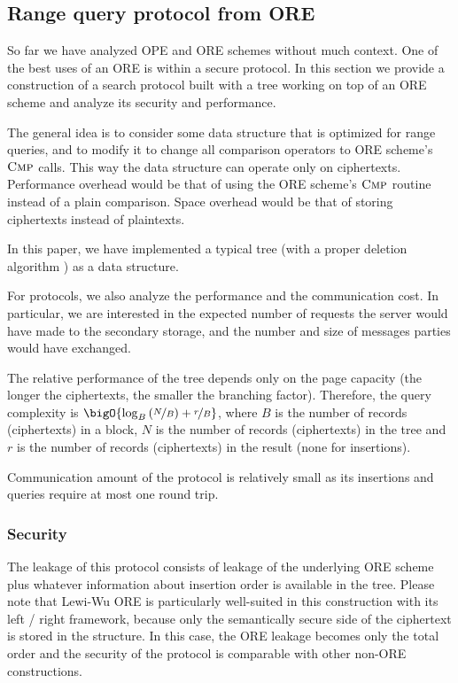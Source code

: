 \subsection{Range query protocol from ORE}\label{section:range-snapshot:ore-to-protocol}

	So far we have analyzed OPE and ORE schemes without much context.
	One of the best uses of an ORE is within a secure protocol.
	In this section we provide a construction of a search protocol built with a {\BPlus} tree working on top of an ORE scheme and analyze its security and performance.

	The general idea is to consider some data structure that is optimized for range queries, and to modify it to change all comparison operators to ORE scheme's $\textsc{Cmp}$ calls.
	This way the data structure can operate only on ciphertexts.
	Performance overhead would be that of using the ORE scheme's $\textsc{Cmp}$ routine instead of a plain comparison.
	Space overhead would be that of storing ciphertexts instead of plaintexts.

	In this paper, we have implemented a typical {\BPlus} tree \cite{b-tree} (with a proper deletion algorithm \cite{b-plus-tree-deletion}) as a data structure.

	For protocols, we also analyze the {\IO} performance and the communication cost.
	In particular, we are interested in the expected number of {\IO} requests the server would have made to the secondary storage, and the number and size of messages parties would have exchanged.

	The relative performance of the {\BPlus} tree depends only on the page capacity (the longer the ciphertexts, the smaller the branching factor). 	Therefore, the query complexity is $\bigO{\log_B \left( \nicefrac{N}{B} \right) + \nicefrac{r}{B}}$, where $B$ is the number of records (ciphertexts) in a block, $N$ is the number of records (ciphertexts) in the tree and $r$ is the number of records (ciphertexts) in the result (none for insertions).

	Communication amount of the protocol is relatively small as its insertions and queries require at most one round trip.

	\subsubsection{Security}
		The leakage of this protocol consists of leakage of the underlying ORE scheme plus whatever information about insertion order is available in the {\BPlus} tree.
		Please note that Lewi-Wu \cite{lewi-wu-ore} ORE is particularly well-suited in this construction with its left / right framework, because only the semantically secure side of the ciphertext is stored in the structure.
		In this case, the ORE leakage becomes only the total order and the security of the protocol is comparable with other non-ORE constructions.

